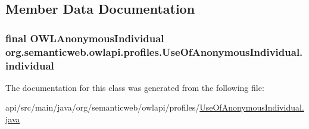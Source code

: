 \subsection{Member Data Documentation}
\hypertarget{classorg_1_1semanticweb_1_1owlapi_1_1profiles_1_1_use_of_anonymous_individual_ab1776000138a3cb75e2b106a19a9c5f2}{
\subsubsection[{individual}]{\setlength{\rightskip}{0pt plus 5cm}final {\bf O\-W\-L\-Anonymous\-Individual} org.\-semanticweb.\-owlapi.\-profiles.\-Use\-Of\-Anonymous\-Individual.\-individual\hspace{0.3cm}{\ttfamily [private]}}}\label{classorg_1_1semanticweb_1_1owlapi_1_1profiles_1_1_use_of_anonymous_individual_ab1776000138a3cb75e2b106a19a9c5f2}


The documentation for this class was generated from the following file\-:\begin{DoxyCompactItemize}
\item 
api/src/main/java/org/semanticweb/owlapi/profiles/\hyperlink{_use_of_anonymous_individual_8java}{Use\-Of\-Anonymous\-Individual.\-java}\end{DoxyCompactItemize}
